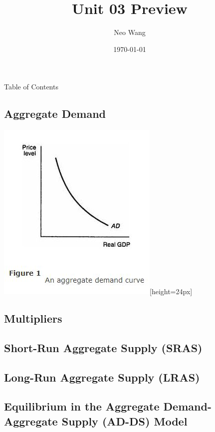 \documentclass{beamer}
\title{Unit 03 Preview}
\date{\today}
\author{Neo Wang}
\institute{Westlake High School}
\begin{document}
  \maketitle
  \begin{frame}{Table of Contents}
	\tableofcontents
  \end{frame}
  \begin{frame}
	\section{Aggregate Demand}
	\includegraphics{2021-10-12-11-50-24.png}[height=24px]
  \end{frame}
  \begin{frame}
	\section{Multipliers}
  \end{frame}
  \begin{frame}
	\section{Short-Run Aggregate Supply (SRAS)}
  \end{frame}
  \begin{frame}
	\section{Long-Run Aggregate Supply (LRAS)}
  \end{frame}
  \begin{frame}
	\section{Equilibrium in the Aggregate Demand-Aggregate Supply (AD-DS) Model}
  \end{frame}
\end{document}
